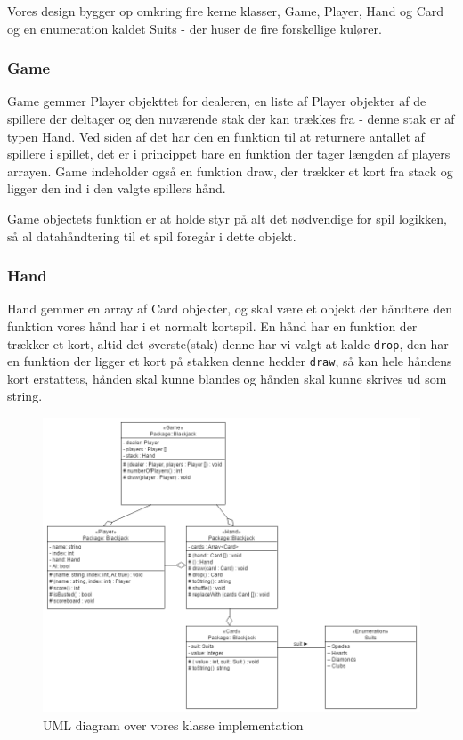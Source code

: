 \documentclass[a4paper]{article}
\begin{document}
      Vores design bygger op omkring fire kerne klasser,
      Game, Player, Hand og Card og en enumeration kaldet Suits - der huser de fire forskellige kulører.

      \subsubsection*{Game}
      Game gemmer Player objekttet for dealeren, en liste af Player objekter af de spillere der deltager
      og den nuværende stak der kan trækkes fra - denne stak er af typen Hand.
      Ved siden af det har den en funktion til at returnere antallet af spillere i spillet,
      det er i princippet bare en funktion der tager længden af players arrayen.
      Game indeholder også en funktion draw, der trækker et kort fra stack og ligger den ind i den valgte spillers hånd.

      Game objectets funktion er at holde styr på alt det nødvendige for spil logikken,
      så al datahåndtering til et spil foregår i dette objekt.

      \subsubsection*{Hand}
      Hand gemmer en array af Card objekter, og skal være et objekt der håndtere den funktion vores hånd har i et normalt kortspil.
      En hånd har en funktion der trækker et kort, altid det øverste(stak) denne har vi valgt at kalde \lstinline$drop$,
      den har en funktion der ligger et kort på stakken denne hedder \lstinline$draw$,
      så kan hele håndens kort erstattets, hånden skal kunne blandes og hånden skal kunne skrives ud som string.

      \begin{figure}[H]
        \centering

        \includegraphics[width=520px]{figures/uml.png}

        \caption{UML diagram over vores klasse implementation}
        \label{fig:umlDiagram}
      \end{figure}
\end{document}
